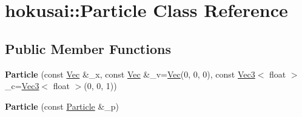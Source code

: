 \hypertarget{classhokusai_1_1Particle}{\section{hokusai\+:\+:Particle Class Reference}
\label{classhokusai_1_1Particle}
}
\subsection*{Public Member Functions}
\begin{DoxyCompactItemize}
\item 
\hypertarget{classhokusai_1_1Particle_ace6c914996bc156d528ed6a9a4b2e415}{{\bfseries Particle} (const \hyperlink{classhokusai_1_1Vec3}{Vec} \&\+\_\+x, const \hyperlink{classhokusai_1_1Vec3}{Vec} \&\+\_\+v=\hyperlink{classhokusai_1_1Vec3}{Vec}(0, 0, 0), const \hyperlink{classhokusai_1_1Vec3}{Vec3}$<$ float $>$ \+\_\+c=\hyperlink{classhokusai_1_1Vec3}{Vec3}$<$ float $>$(0, 0, 1))}\label{classhokusai_1_1Particle_ace6c914996bc156d528ed6a9a4b2e415}

\item 
\hypertarget{classhokusai_1_1Particle_a4d56c3658114ccbefce454e28816405f}{{\bfseries Particle} (const \hyperlink{classhokusai_1_1Particle}{Particle} \&\+\_\+p)}\label{classhokusai_1_1Particle_a4d56c3658114ccbefce454e28816405f}

\end{DoxyCompactItemize}
